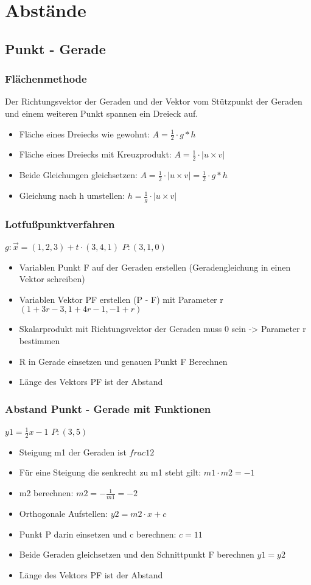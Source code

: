 \section{Abstände}

\subsection{Punkt - Gerade}
\begin{frame}
    \frametitle{Flächenmethode}
    Der Richtungsvektor der Geraden und der Vektor vom Stützpunkt der Geraden und einem weiteren Punkt spannen ein Dreieck auf.
    \begin{itemize}
        \item Fläche eines Dreiecks wie gewohnt: $A = \frac{1}{2} \cdot g * h$
        \item Fläche eines Dreiecks mit Kreuzprodukt: $A = \frac{1}{2} \cdot |u \times v|$
        \item Beide Gleichungen gleichsetzen: $A = \frac{1}{2} \cdot |u \times v| = \frac{1}{2} \cdot g * h$
        \item Gleichung nach h umstellen: $h = \frac{1}{g} \cdot |u \times v|$
    \end{itemize}
\end{frame}

\begin{frame}
    \frametitle{Lotfußpunktverfahren}
    $g: \vec{x} = (1,2,3) + t \cdot (3,4,1)$
    $P: (3,1,0)$
    \begin{itemize}
        \item Variablen Punkt F auf der Geraden erstellen (Geradengleichung in einen Vektor schreiben)
        \item Variablen Vektor PF erstellen (P - F) mit Parameter r $(1+3r-3, 1+4r-1, -1+r)$
        \item Skalarprodukt mit Richtungsvektor der Geraden muss 0 sein -> Parameter r bestimmen
        \item R in Gerade einsetzen und genauen Punkt F Berechnen
        \item Länge des Vektors PF ist der Abstand
    \end{itemize}
\end{frame}

\begin{frame}
    \frametitle{Abstand Punkt - Gerade mit Funktionen}
    $y1 = \frac{1}{2}x -1$
    $P: (3,5)$
    \begin{itemize}
        \item Steigung m1 der Geraden ist $frac{1}{2}$
        \item Für eine Steigung die senkrecht zu m1 steht gilt: $m1 \cdot m2 = -1$
        \item m2 berechnen: $m2 = -\frac{1}{m1} = -2$
        \item Orthogonale Aufstellen: $y2 = m2 \cdot x + c$
        \item Punkt P darin einsetzen und c berechnen: $c = 11$
        \item Beide Geraden gleichsetzen und den Schnittpunkt F berechnen $y1 = y2$
        \item Länge des Vektors PF ist der Abstand
    \end{itemize}
\end{frame}